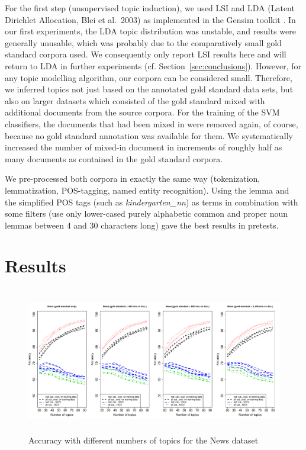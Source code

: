 \documentclass[11pt]{article}
\begin{document}
For the first step (unsupervised topic induction), we used LSI and LDA (Latent Dirichlet Allocation, Blei et al.\ 2003\nocite{BleiEa2003}) as implemented in the Gensim toolkit \cite{RehurekSojka2010}.
In our first experiments, the LDA topic distribution was unstable, and results were generally unusable, which was probably due to the comparatively small gold standard corpora used.
We consequently only report LSI results here and will return to LDA in further experiments (cf. Section~\ref{sec:conclusions}).
However, for any topic modelling algorithm, our corpora can be considered small.
Therefore, we inferred topics not just based on the annotated gold standard data sets, but also on larger datasets which consisted of the gold standard mixed with additional documents from the source corpora.
For the training of the SVM classifiers, the documents that had been mixed in were removed again, of course, because no gold standard annotation was available for them.
We systematically increased the number of mixed-in document in increments of roughly half as many documents as contained in the gold standard corpora.

We pre-processed both corpora in exactly the same way (tokenization, lemmatization, POS-tagging, named entity recognition).
Using the lemma and the simplified POS tags (such as \textit{kindergarten\_nn}) as terms in combination with some filters (use only lower-cased purely alphabetic common and proper noun lemmas between 4 and 30 characters long) gave the best results in pretests.

\section{Results}
\label{sec:results}

\begin{figure}[!ht]
  \centering
  \includegraphics[width=\textwidth, height=6.4cm]{graphics/dereko.pdf}
  \caption{Accuracy with different numbers of topics for the News dataset}
  \label{fig:dereko}
\end{figure}
\end{document}
